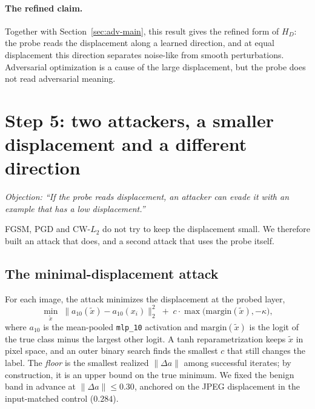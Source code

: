 \documentclass[../ppgc-tese.tex]{subfiles}
\begin{document}
\paragraph*{The refined claim.}
Together with Section~\ref{sec:adv-main}, this result gives the refined form
of $H_{D}$: the probe reads the displacement along a learned direction, and at
equal displacement this direction separates noise-like from smooth
perturbations. Adversarial optimization is a cause of the large displacement,
but the probe does not read adversarial meaning.

\section{Step 5: two attackers, a smaller displacement and a different direction}
\label{sec:adv-attackers}
\emph{Objection: ``If the probe reads displacement, an attacker can evade it
with an example that has a low displacement.''}

FGSM, PGD and CW-$L_2$ do not try to keep the displacement small. We therefore
built an attack that does, and a second attack that uses the probe itself.

\subsection{The minimal-displacement attack}
\label{sec:adv-lowdx}
For each image, the attack minimizes the displacement at the probed layer,
\begin{equation}
  \min_{\tilde{x}} \;\lVert a_{10}(\tilde{x}) - a_{10}(x_i)\rVert_2^2
  \;+\; c\cdot\max\bigl(\mathrm{margin}(\tilde{x}), -\kappa\bigr),
  \label{eq:adv-mindisp}
\end{equation}
where $a_{10}$ is the mean-pooled \texttt{mlp\_10} activation and
$\mathrm{margin}(\tilde{x})$ is the logit of the true class minus the largest
other logit. A tanh reparametrization keeps $\tilde{x}$ in pixel space, and an
outer binary search finds the smallest $c$ that still changes the label. The
\emph{floor} is the smallest realized $\lVert\Delta a\rVert$ among successful
iterates; by construction, it is an upper bound on the true minimum. We fixed
the benign band in advance at $\lVert\Delta a\rVert \leq 0.30$, anchored on
the JPEG displacement in the input-matched control ($0.284$).
\end{document}
